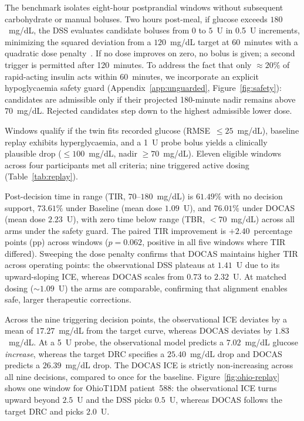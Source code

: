 \documentclass[a4paper,fleqn]{cas-sc}
\begin{document}
The benchmark isolates eight-hour postprandial windows without subsequent carbohydrate
or manual boluses. Two hours post-meal, if glucose exceeds $180$~mg/dL, the DSS
evaluates candidate boluses from $0$ to $5$~U in 0.5~U increments, minimizing the
squared deviation from a $120$~mg/dL target at 60~minutes with a quadratic dose
penalty~\citep{prendin2023}. If no dose improves on zero, no bolus is given; a
second trigger is permitted after 120~minutes. To address the fact that only $\approx 20\%$
of rapid-acting insulin acts within 60~minutes, we incorporate an explicit
hypoglycaemia safety guard (Appendix~\ref{app:unguarded}, Figure~\ref{fig:safety}):
candidates are admissible only if their projected 180-minute nadir remains above
$70$~mg/dL. Rejected candidates step down to the highest admissible lower dose.

Windows qualify if the twin fits recorded glucose (RMSE~$\le 25$~mg/dL), baseline
replay exhibits hyperglycaemia, and a 1~U probe bolus yields a clinically plausible
drop ($\le 100$~mg/dL, nadir $\ge 70$~mg/dL). Eleven eligible windows across four
participants met all criteria; nine triggered active dosing (Table~\ref{tab:replay}).

Post-decision time in range (TIR, $70$--$180$~mg/dL) is $61.49\%$ with no
decision support, $73.61\%$ under Baseline (mean dose $1.09$~U), and
$76.01\%$ under DOCAS (mean dose $2.23$~U), with zero time below range
(TBR, $<70$~mg/dL) across all arms under the safety guard. The paired TIR
improvement is $+2.40$~percentage points (pp) across windows
($p{=}0.062$, positive in all five windows where TIR differed).
Sweeping the dose penalty confirms
that DOCAS maintains higher TIR across operating points: the observational DSS plateaus
at $1.41$~U due to its upward-sloping ICE, whereas DOCAS scales from
$0.73$ to $2.32$~U. At matched dosing ($\sim 1.09$~U) the arms are
comparable, confirming that alignment enables safe, larger therapeutic
corrections.

Across the nine triggering decision points, the observational ICE deviates by a mean
of $17.27$~mg/dL from the target curve, whereas DOCAS deviates by $1.83$~mg/dL. At
a 5~U probe, the observational model predicts a $7.02$~mg/dL glucose \emph{increase},
whereas the target DRC specifies a $25.40$~mg/dL drop and DOCAS predicts a
$26.39$~mg/dL drop. The DOCAS ICE is strictly non-increasing across all nine
decisions, compared to once for the baseline.
Figure~\ref{fig:ohio-replay} shows one window for OhioT1DM patient~588: the
observational ICE turns upward beyond $2.5$~U and the DSS picks $0.5$~U,
whereas DOCAS follows the target DRC and picks $2.0$~U.
\end{document}
